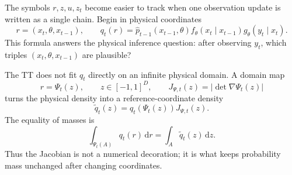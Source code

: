 \documentclass[11pt]{article}
\numberwithin{equation}{section}
\newcommand{\dd}{\,\mathrm d}
\begin{document}
The symbols \(r,z,u,z_t\) become easier to track when one observation update is
written as a single chain.  Begin in physical coordinates
\begin{equation}
    r=(x_t,\theta,x_{t-1}),
    \qquad
    q_t(r)
    =
    \widehat p_{t-1}(x_{t-1},\theta)
    f_\theta(x_t\mid x_{t-1})
    g_\theta(y_t\mid x_t).
    \label{eq:p25-walk-1}
\end{equation}
This formula answers the physical inference question: after observing \(y_t\),
which triples \((x_t,\theta,x_{t-1})\) are plausible?

The TT does not fit \(q_t\) directly on an infinite physical domain.  A domain
map
\begin{equation}
    r=\Psi_t(z),
    \qquad
    z\in[-1,1]^D,
    \qquad
    J_{\Psi,t}(z)=|\det\nabla\Psi_t(z)|
    \label{eq:p25-walk-2}
\end{equation}
turns the physical density into a reference-coordinate density
\begin{equation}
    \widetilde q_t(z)
    =
    q_t(\Psi_t(z))J_{\Psi,t}(z).
    \label{eq:p25-walk-3}
\end{equation}
The equality of masses is
\begin{equation}
    \int_{\Psi_t(A)} q_t(r)\dd r
    =
    \int_A \widetilde q_t(z)\dd z.
    \label{eq:p25-walk-4}
\end{equation}
Thus the Jacobian is not a numerical decoration; it is what keeps probability
mass unchanged after changing coordinates.
\end{document}
